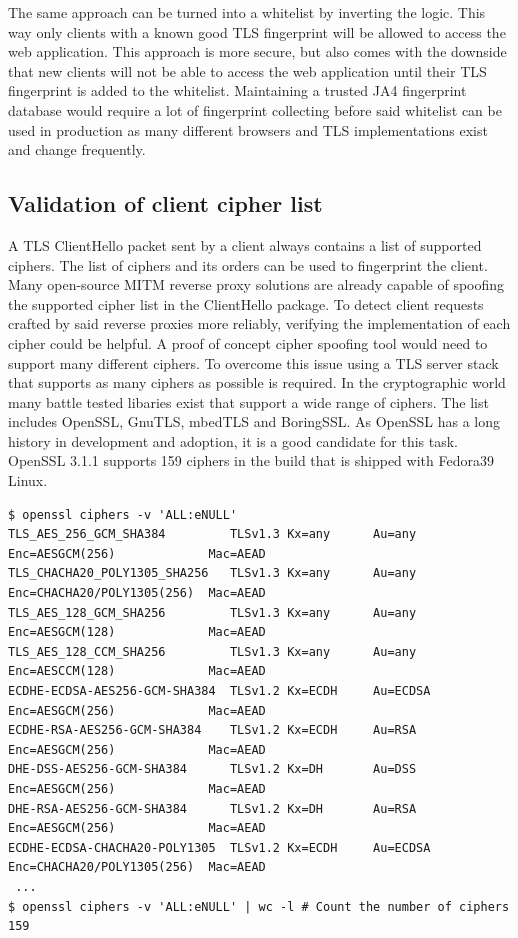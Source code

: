 \documentclass[12pt]{scrbook}
\begin{document}
The same approach can be turned into a whitelist by inverting the logic. This
way only clients with a known good TLS fingerprint will be allowed to access the
web application. This approach is more secure, but also comes with the downside
that new clients will not be able to access the web application until their TLS
fingerprint is added to the whitelist. Maintaining a trusted JA4 fingerprint
database would require a lot of fingerprint collecting before said whitelist can
be used in production as many different browsers and TLS implementations exist
and change frequently.

\subsection{Validation of client cipher list} A TLS ClientHello packet sent
by a client always contains a list of supported ciphers. The list of ciphers
and its orders can be used to fingerprint the client. Many open-source MITM
reverse proxy solutions are already capable of spoofing the supported cipher
list in the ClientHello package. To detect client requests crafted by said
reverse
proxies more reliably, verifying the implementation of each cipher could be
helpful. A proof of concept cipher spoofing tool would need to support many
different ciphers. To overcome this issue using a TLS server stack that
supports as many ciphers as possible is required. In the cryptographic world
many battle tested
libaries exist that support a wide range of ciphers. The list includes OpenSSL,
GnuTLS, mbedTLS and BoringSSL.
As OpenSSL has a long history in development and adoption, it is a good
candidate for this task.
OpenSSL 3.1.1 supports 159 ciphers in the build that is shipped with Fedora39
Linux.

\begin{lstlisting}[breaklines=true,basicstyle=\tiny,caption={Listing supported
            ciphers and counting them in a shell},captionpos=b]
$ openssl ciphers -v 'ALL:eNULL'
TLS_AES_256_GCM_SHA384         TLSv1.3 Kx=any      Au=any   Enc=AESGCM(256)             Mac=AEAD
TLS_CHACHA20_POLY1305_SHA256   TLSv1.3 Kx=any      Au=any   Enc=CHACHA20/POLY1305(256)  Mac=AEAD
TLS_AES_128_GCM_SHA256         TLSv1.3 Kx=any      Au=any   Enc=AESGCM(128)             Mac=AEAD
TLS_AES_128_CCM_SHA256         TLSv1.3 Kx=any      Au=any   Enc=AESCCM(128)             Mac=AEAD
ECDHE-ECDSA-AES256-GCM-SHA384  TLSv1.2 Kx=ECDH     Au=ECDSA Enc=AESGCM(256)             Mac=AEAD
ECDHE-RSA-AES256-GCM-SHA384    TLSv1.2 Kx=ECDH     Au=RSA   Enc=AESGCM(256)             Mac=AEAD
DHE-DSS-AES256-GCM-SHA384      TLSv1.2 Kx=DH       Au=DSS   Enc=AESGCM(256)             Mac=AEAD
DHE-RSA-AES256-GCM-SHA384      TLSv1.2 Kx=DH       Au=RSA   Enc=AESGCM(256)             Mac=AEAD
ECDHE-ECDSA-CHACHA20-POLY1305  TLSv1.2 Kx=ECDH     Au=ECDSA Enc=CHACHA20/POLY1305(256)  Mac=AEAD
 ...
$ openssl ciphers -v 'ALL:eNULL' | wc -l # Count the number of ciphers
159
    \end{lstlisting}
\end{document}
